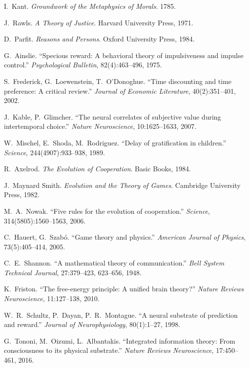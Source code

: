 \documentclass[11pt]{article}
\begin{document}
\begin{thebibliography}{99}\setlength{\itemsep}{2pt}

 I.~Kant. \emph{Groundwork of the Metaphysics of Morals}. 1785.

 J.~Rawls. \emph{A Theory of Justice}. Harvard University Press, 1971.

 D.~Parfit. \emph{Reasons and Persons}. Oxford University Press, 1984.

 G.~Ainslie. ``Specious reward: A behavioral theory of impulsiveness and impulse control.'' \emph{Psychological Bulletin}, 82(4):463--496, 1975.

 S.~Frederick, G.~Loewenstein, T.~O'Donoghue. ``Time discounting and time preference: A critical review.'' \emph{Journal of Economic Literature}, 40(2):351--401, 2002.

 J.~Kable, P.~Glimcher. ``The neural correlates of subjective value during intertemporal choice.'' \emph{Nature Neuroscience}, 10:1625--1633, 2007.

 W.~Mischel, E.~Shoda, M.~Rodriguez. ``Delay of gratification in children.'' \emph{Science}, 244(4907):933--938, 1989.

 R.~Axelrod. \emph{The Evolution of Cooperation}. Basic Books, 1984.

 J.~Maynard Smith. \emph{Evolution and the Theory of Games}. Cambridge University Press, 1982.

 M.~A.~Nowak. ``Five rules for the evolution of cooperation.'' \emph{Science}, 314(5805):1560--1563, 2006.

 C.~Hauert, G.~Szab\'o. ``Game theory and physics.'' \emph{American Journal of Physics}, 73(5):405--414, 2005.

 C.~E.~Shannon. ``A mathematical theory of communication.'' \emph{Bell System Technical Journal}, 27:379--423, 623--656, 1948.

 K.~Friston. ``The free-energy principle: A unified brain theory?'' \emph{Nature Reviews Neuroscience}, 11:127--138, 2010.

 W.~R.~Schultz, P.~Dayan, P.~R.~Montague. ``A neural substrate of prediction and reward.'' \emph{Journal of Neurophysiology}, 80(1):1--27, 1998.

 G.~Tononi, M.~Oizumi, L.~Albantakis. ``Integrated information theory: From consciousness to its physical substrate.'' \emph{Nature Reviews Neuroscience}, 17:450--461, 2016.


\end{thebibliography}
\end{document}
